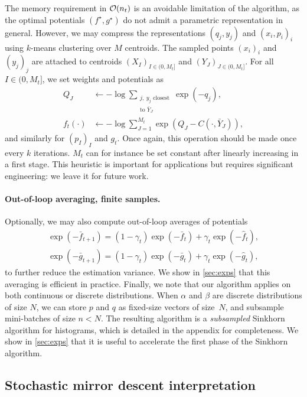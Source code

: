 The memory requirement in $\mathcal{O}(n_t)$ is an
avoidable limitation of the algorithm, as the optimal
potentials $(f^\star, g^\star)$ do not admit a parametric representation in
general. However, we may compress the representations $(q_j, y_j)$ and $(x_i,
p_i)_i$ using $k$-means clustering over $M$ centroids. The
sampled points $(x_i)_i$ and $(y_j)_j$ are attached to centroids ${(X_I)}_{I \in
(0,M_t]}$ and ${(Y_J)}_{J \in (0,M_t]}$. For all $I \in (0, M_t]$, we set
weights and potentials as
\begin{align}
    Q_J &\gets - \log \sum_{\substack{j,\:y_j \text{ closest}\\\text{to } \bar Y_J}}
     \exp(-q_j),\\
    f_t(\cdot) &\gets - \log\sum_{J=1}^{M_t} \exp(Q_J - C(\cdot, \bar Y_J)),
\end{align}
and similarly for $(p_I)_I$ and $g_t$. Once again, this operation should be made
once every $k$ iterations. $M_t$ can for instance be set constant after linearly
increasing in a first stage. This heuristic is important for applications but
requires significant engineering: we leave it for future work.

\paragraph{Out-of-loop averaging, finite samples.} Optionally, we may also
compute out-of-loop averages of potentials
\begin{align}
    \exp(-\bar f_{t+1}) = (1 - \gamma_t) \exp(-\bar f_t) + \gamma_t \exp(-\hat f_t), \\
    \exp(-\bar g_{t+1}) = (1 - \gamma_t) \exp(-\bar g_t) + \gamma_t \exp(-\hat g_t),
\end{align}
to further reduce the estimation variance. We show in \autoref{sec:exps} that
this averaging is efficient in practice. Finally, we note that our algorithm
applies on both continuous or discrete distributions. When $\alpha$ and $\beta$
are discrete distributions of size $N$, we can store $p$ and $q$ as fixed-size
vectors of size~$N$, and subsample mini-batches of size $n < N$. The resulting
algorithm is a \textit{subsampled} Sinkhorn algorithm for histograms, which is
detailed in the appendix for completeness. We show in \autoref{sec:exps} that it
is useful to accelerate the first phase of the Sinkhorn algorithm.


\subsection{Stochastic mirror descent interpretation}
\label{sec-mirror}

